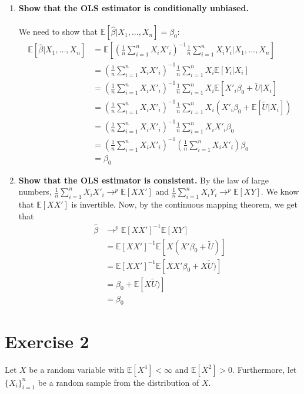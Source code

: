\documentclass[]{article}
\newcommand{\sumin}{\sum\limits_{i=1}^n} %
\newcommand{\E}{\mathbb{E}}
\begin{document}
\begin{enumerate}[label = (\roman*)]
\item \textbf{Show that the OLS estimator is conditionally unbiased.}\\
\\
We need to show that $\E[\hat{\beta}|X_1,...,X_n] = \beta_0$:
\begin{align*}
\E[\hat{\beta}|X_1,...,X_n] 
& = \E\left[\left(\frac{1}{n} \sumin X_iX'_i\right)^{-1} \frac{1}{n} \sumin X_iY_i\bigg|X_1,...,X_n\right]
\\
& = \left(\frac{1}{n} \sumin X_iX'_i\right)^{-1} 
    \frac{1}{n}\sumin X_i \E[Y_i|X_i]
\\
& = \left(\frac{1}{n} \sumin X_iX'_i\right)^{-1} 
    \frac{1}{n}\sumin X_i 
    \E[X'_i\beta_0 + \tilde{U}|X_i]
\\
& = \left(\frac{1}{n} \sumin X_iX'_i\right)^{-1} 
    \frac{1}{n}\sumin X_i (
    X'_i\beta_0 + \E[\tilde{U}|X_i])
\\
& = \left(\frac{1}{n} \sumin X_iX'_i\right)^{-1} 
    \frac{1}{n}\sumin X_i X'_i\beta_0
\\
& = \left(\frac{1}{n} \sumin X_iX'_i\right)^{-1} 
    \left(\frac{1}{n}\sumin X_i X'_i\right)\beta_0
\\
& = \beta_0
\end{align*}


\item \textbf{Show that the OLS estimator is consistent.}
By the law of large numbers, $ \frac{1}{n} \sumin X_iX'_i \rightarrow^p \E[XX']$ and $\frac{1}{n} \sumin X_iY_i \rightarrow^p \E[XY]$. We know that $\E[XX']$ is invertible. Now, by the continuous mapping theorem, we get that 
\begin{align*}
\hat{\beta} & \rightarrow^p \E[XX']^{-1} \E[XY]
\\
& = \E[XX']^{-1} \E[X(X'\beta_0 +\tilde{U})]
\\
& = \E[XX']^{-1} \E[XX'\beta_0 +X\tilde{U})]
\\
& = \beta_0 + \E[X\tilde{U})]
\\
& = \beta_0
\end{align*}


\end{enumerate}



\section*{Exercise 2} 
Let $X$ be a random variable with $\E[X^4]<\infty$ and $\E[X^2] > 0$. Furthermore, let $\{X_i\}^n_{i=1}$ be a random sample from the distribution of $X$.
\end{document}
